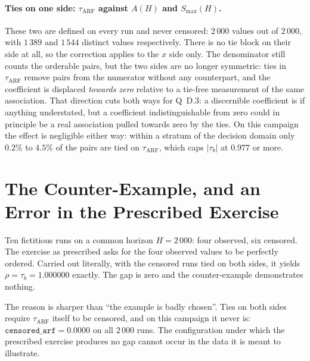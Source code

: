\documentclass[11pt,a4paper]{article}
\begin{document}
\paragraph{Ties on one side: $\tau_{\mathrm{ARF}}$ against $A(H)$ and $S_{\max}(H)$.}
These two are defined on every run and never censored: $2\,000$ values out of $2\,000$,
with $1\,389$ and $1\,544$ distinct values respectively. There is no tie block on their
side at all, so the correction applies to the $x$ side only. The denominator still counts
the orderable pairs, but the two sides are no longer symmetric: ties in
$\tau_{\mathrm{ARF}}$ remove pairs from the numerator without any counterpart, and the
coefficient is displaced \emph{towards zero} relative to a tie-free measurement of the same
association. That direction cuts both ways for Q~D.3: a discernible coefficient is if
anything understated, but a coefficient indistinguishable from zero could in principle be a
real association pulled towards zero by the ties. On this campaign the effect is negligible
either way: within a stratum of the decision domain only $0.2\%$ to $4.5\%$ of the pairs
are tied on $\tau_{\mathrm{ARF}}$, which caps $|\tau_b|$ at $0.977$ or more.

\section{The Counter-Example, and an Error in the Prescribed Exercise}
\label{sec:contre}

Ten fictitious runs on a common horizon $H = 2\,000$: four observed, six censored. The
exercise as prescribed asks for the four observed values to be perfectly ordered. Carried
out literally, with the censored runs tied on both sides, it yields
$\rho = \tau_b = 1.000000$ exactly. The gap is zero and the counter-example demonstrates
nothing.

The reason is sharper than ``the example is badly chosen''. Ties on both sides require
$\tau_{\mathrm{ARF}}$ itself to be censored, and on this campaign it never is:
$\texttt{censored\_arf} = 0.0000$ on all $2\,000$ runs. The configuration under which the
prescribed exercise produces no gap cannot occur in the data it is meant to illustrate.
\end{document}
